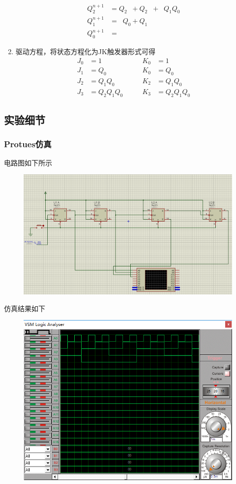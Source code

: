 \documentclass[11pt,UTF8]{ctexart}
\newcommand{\ol}[1]{\mathop{\overline{#1}}}%
\begin{document}
\begin{enumerate}
\[\begin{aligned}
    Q_2^{n+1}&=Q_2\ol{Q_1}+Q_2\ol{Q_0}+\ol{Q_2}Q_1Q_0\\
    Q_1^{n+1}&=\ol{Q_1}Q_0+Q_1\ol{Q_0}\\
    Q_0^{n+1}&=\ol{Q_0}
    \end{aligned}\]
    \item 驱动方程，将状态方程化为JK触发器形式可得
    \[\begin{aligned}
    J_0&=1 \qquad &K_0&=1\\
    J_1&=Q_0 \qquad &K_0&=Q_0\\
    J_2&=Q_1Q_0 \qquad &K_2&=Q_1Q_0\\
    J_3&=Q_2Q_1Q_0 \qquad &K_3&=Q_2Q_1Q_0
    \end{aligned}\]
\end{enumerate}

\subsection{实验细节}
\subsubsection{Protues仿真}
\par 电路图如下所示
\begin{figure}[H]
    \centering
    \includegraphics[width=0.8\linewidth]{fig/16addition_asyn.PNG}
\end{figure}
\par 仿真结果如下
\begin{figure}[H]
    \centering
    \includegraphics[width=0.6\linewidth]{fig/16addition_asyn_wave.PNG}
\end{figure}
\end{document}
